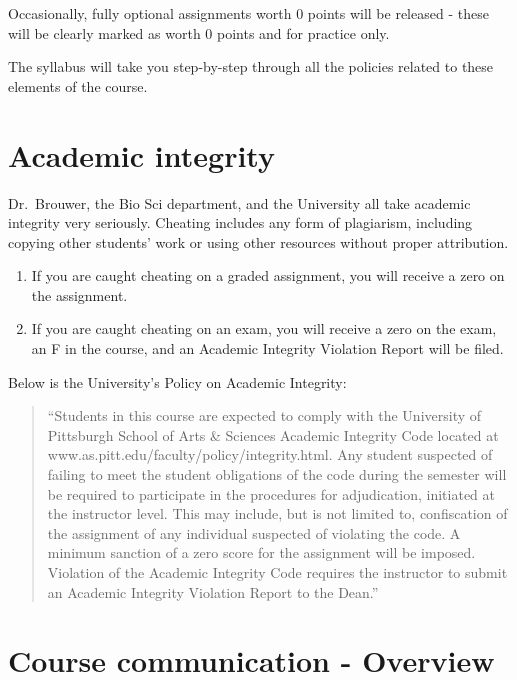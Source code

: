 \documentclass[
]{book}
\providecommand{\tightlist}{%
  \setlength{\itemsep}{0pt}\setlength{\parskip}{0pt}}
\begin{document}
Occasionally, fully optional assignments worth 0 points will be released - these will be clearly marked as worth 0 points and for practice only.

The syllabus will take you step-by-step through all the policies related to these elements of the course.

\hypertarget{academic-integrity}{%
\chapter{Academic integrity}\label{academic-integrity}}

Dr.~Brouwer, the Bio Sci department, and the University all take academic integrity very seriously. Cheating includes any form of plagiarism, including copying other students' work or using other resources without proper attribution.

\begin{enumerate}
\def\labelenumi{\arabic{enumi}.}
\tightlist
\item
  If you are caught cheating on a graded assignment, you will receive a zero on the assignment.
\item
  If you are caught cheating on an exam, you will receive a zero on the exam, an F in the course, and an Academic Integrity Violation Report will be filed.
\end{enumerate}

Below is the University's Policy on Academic Integrity:

\begin{quote}
``Students in this course are expected to comply with the University of Pittsburgh School of Arts \& Sciences Academic Integrity Code located at www.as.pitt.edu/faculty/policy/integrity.html. Any student suspected of failing to meet the student obligations of the code during the semester will be required to participate in the procedures for adjudication, initiated at the instructor level. This may include, but is not limited to, confiscation of the assignment of any individual suspected of violating the code. A minimum sanction of a zero score for the assignment will be imposed. Violation of the Academic Integrity Code requires the instructor to submit an Academic Integrity Violation Report to the Dean.''
\end{quote}

\hypertarget{course-communication---overview}{%
\chapter{Course communication - Overview}\label{course-communication---overview}}
\end{document}
